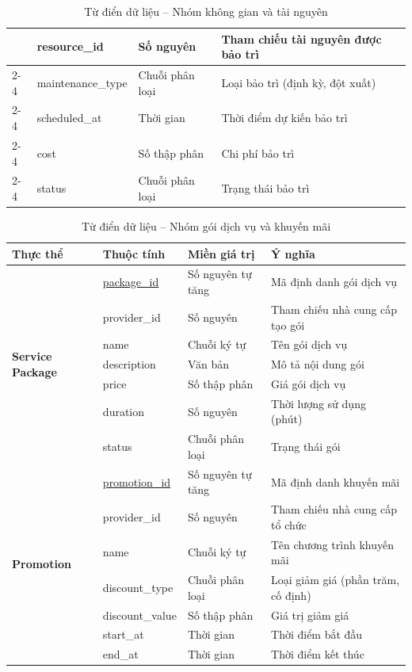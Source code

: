 \begin{table}[htbp]
\begin{tabular}{|l|l|l|p{5.5cm}|}
        & resource\_id & Số nguyên & Tham chiếu tài nguyên được bảo trì \\ \cline{2-4}
        & maintenance\_type & Chuỗi phân loại & Loại bảo trì (định kỳ, đột xuất) \\ \cline{2-4}
        & scheduled\_at & Thời gian & Thời điểm dự kiến bảo trì \\ \cline{2-4}
        & cost & Số thập phân & Chi phí bảo trì \\ \cline{2-4}
        & status & Chuỗi phân loại & Trạng thái bảo trì \\ \hline
    \end{tabular}
    \caption{Từ điển dữ liệu -- Nhóm không gian và tài nguyên}
\end{table}

\begin{table}[htbp]
    \centering
    \label{tab:data_dictionary_3}
    \renewcommand{\arraystretch}{1.3}
    \scriptsize
    \begin{tabular}{|l|l|l|p{5.5cm}|}
        \hline
        \textbf{Thực thể} & \textbf{Thuộc tính} & \textbf{Miền giá trị} & \textbf{Ý nghĩa} \\ \hline
        \multirow{7}{*}{\textbf{Service Package}}
        & \underline{package\_id} & Số nguyên tự tăng & Mã định danh gói dịch vụ \\ \cline{2-4}
        & provider\_id & Số nguyên & Tham chiếu nhà cung cấp tạo gói \\ \cline{2-4}
        & name & Chuỗi ký tự & Tên gói dịch vụ \\ \cline{2-4}
        & description & Văn bản & Mô tả nội dung gói \\ \cline{2-4}
        & price & Số thập phân & Giá gói dịch vụ \\ \cline{2-4}
        & duration & Số nguyên & Thời lượng sử dụng (phút) \\ \cline{2-4}
        & status & Chuỗi phân loại & Trạng thái gói \\ \hline
        \multirow{7}{*}{\textbf{Promotion}}
        & \underline{promotion\_id} & Số nguyên tự tăng & Mã định danh khuyến mãi \\ \cline{2-4}
        & provider\_id & Số nguyên & Tham chiếu nhà cung cấp tổ chức \\ \cline{2-4}
        & name & Chuỗi ký tự & Tên chương trình khuyến mãi \\ \cline{2-4}
        & discount\_type & Chuỗi phân loại & Loại giảm giá (phần trăm, cố định) \\ \cline{2-4}
        & discount\_value & Số thập phân & Giá trị giảm giá \\ \cline{2-4}
        & start\_at & Thời gian & Thời điểm bắt đầu \\ \cline{2-4}
        & end\_at & Thời gian & Thời điểm kết thúc \\ \hline
    \end{tabular}
    \caption{Từ điển dữ liệu -- Nhóm gói dịch vụ và khuyến mãi}
\end{table}

